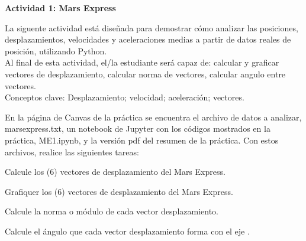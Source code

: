\documentclass[11pt]{exam}
\begin{document}
\sffamily

\firstpageheadrule
{}
\runningheadrule
\rfoot{\thepage\ / \numpages}
\cfoot{ }
\lfoot{\tiny }
\begin{flushleft}
\vspace{0.2in}
\vspace{0.25cm}
\end{flushleft}
\begin{center}
\textbf{Actividad 1: Mars Express}
\end{center}


La siguente actividad está diseñada para  demostrar cómo analizar las posiciones, desplazamientos, velocidades y aceleraciones medias a partir de datos reales de posición, utilizando Python. \\

Al final de esta actividad, el/la estudiante será capaz de: calcular y graficar vectores de desplazamiento, calcular norma de vectores, calcular angulo entre vectores.\\

Conceptos clave: Desplazamiento; velocidad; aceleración; vectores. \\

\begin{questions}
\item En la página de Canvas de la práctica se encuentra el archivo de datos a analizar, marsexpress.txt, un notebook de Jupyter con los códigos mostrados en la práctica, ME1.ipynb, y la versión pdf del resumen de la práctica. Con estos archivos, realice las siguientes tareas:

\begin{parts}
\item  Calcule los (6) vectores de desplazamiento del Mars Express. 
\item Grafiquer los (6) vectores de desplazamiento del Mars Express.
\item  Calcule la norma o módulo de cada vector desplazamiento.
\item Calcule el ángulo que cada vector desplazamiento forma con el eje . 
\end{parts}
\end{questions}
\end{document}
